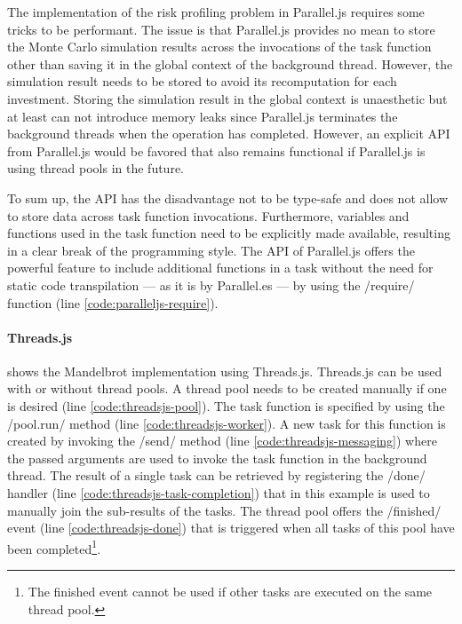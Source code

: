 The implementation of the risk profiling problem in Parallel.js requires some tricks to be performant. The issue is that Parallel.js provides no mean to store the Monte Carlo simulation results across the invocations of the task function other than saving it in the global context of the background thread. However, the simulation result needs to be stored to avoid its recomputation for each investment. Storing the simulation result in the global context is unaesthetic but at least can not introduce memory leaks since Parallel.js terminates the background threads when the operation has completed. However, an explicit API from Parallel.js would be favored that also remains functional if Parallel.js is using thread pools in the future.

To sum up, the API has the disadvantage not to be type-safe and does not allow to store data across task function invocations. Furthermore, variables and functions used in the task function need to be explicitly made available, resulting in a clear break of the programming style. The API of Parallel.js offers the powerful feature to include additional functions in a task without the need for static code transpilation --- as it is by Parallel.es --- by using the \javascriptinline/require/ function (line \ref{code:paralleljs-require}).

\paragraph{Threads.js}
 shows the Mandelbrot implementation using Threads.js. Threads.js can be used with or without thread pools. A thread pool needs to be created manually if one is desired (line \ref{code:threadsjs-pool}). The task function is specified by using the \javascriptinline/pool.run/ method (line \ref{code:threadsjs-worker}). A new task for this function is created by invoking the \javascriptinline/send/ method (line \ref{code:threadsjs-messaging}) where the passed arguments are used to invoke the task function in the background thread. The result of a single task can be retrieved by registering the \javascriptinline/done/ handler (line \ref{code:threadsjs-task-completion}) that in this example is used to manually join the sub-results of the tasks. The thread pool offers the \javascriptinline/finished/ event (line \ref{code:threadsjs-done}) that is triggered when all tasks of this pool have been completed\footnote{The finished event cannot be used if other tasks are executed on the same thread pool.}.

